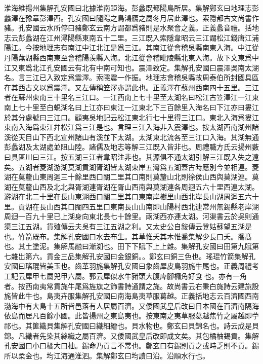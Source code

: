淮海維揚州集解孔安國曰北據淮南距海。彭蠡既都陽鳥所居。集解鄭玄曰地理志彭蠡澤在豫章彭澤西。孔安國曰隨陽之鳥鴻鴈之屬冬月居此澤也。索隱都古文尚書作豬。孔安國云水所停曰豬鄭玄云南方謂都爲豬則是水聚會之義。正義蠡音禮。括地志云彭蠡湖在江州潯陽縣東南五十二里。三江既入索隱韋昭云三江謂松江錢唐江浦陽江。今按地理志有南江中江北江是爲三江。其南江從會稽吳縣南東入海。中江從丹陽蕪湖縣西南東至會稽陽羨縣入海。北江從會稽毗陵縣北東入海。故下文東爲中江又東爲北江孔安國云有北有中南可知也。震澤致定。集解孔安國曰震澤吳南太湖名。言三江已入致定爲震澤。索隱震一作振。地理志會稽吳縣故周泰伯所封國具區在其西古文以爲震澤。又左傳稱笠澤亦謂此也。正義澤在蘇州西南四十五里。三江者在蘇州東南三十里名三江口。一江西南上七十里至太湖名曰松江古笠澤江一江東南上七十里至白蜆湖名曰上江亦曰東江一江東北下三百餘里入海名曰下江亦曰婁江於其分處號曰三江口。顧夷吳地記云松江東北行七十里得三江口。東北入海爲婁江東南入海爲東江幷松江爲三江是也。言理三江入海非入震澤也。按太湖西南湖州諸溪從天目山下西北宣州諸山有溪並下太湖。太湖東北流各至三江口入海。其湖無通彭蠡湖及太湖處並阻山陸。諸儒及地志等解三江既入皆非也。周禮職方氏云揚州藪曰具區川曰三江。按五湖三江者韋昭注非也。其源俱不通太湖引解三江既入失之遠矣。五湖者菱湖游湖莫湖貢湖胥湖皆太湖東岸五灣爲五湖蓋古時應別今並相連。菱湖在莫釐山東周迴三十餘里西口闊二里其口南則莫釐山北則徐侯山西與莫湖連。莫湖在莫釐山西及北北與胥湖連胥湖在胥山西南與莫湖連各周迴五六十里西連太湖。游湖在北二十里在長山東湖西口闊二里其口東南岸樹里山西北岸長山湖周迴五六十里。貢湖在長山西其口闊四五里口東南長山山南即山陽村西北連常州無錫縣老岸湖周迴一百九十里已上湖身向東北長七十餘里。兩湖西亦連太湖。河渠書云於吳則通渠三江五湖。貨殖傳云夫吳有三江五湖之利。又太史公自敍傳云登姑蘇望五湖是也。竹箭既布。集解孔安國曰水去布生。其草惟夭其木惟喬集解少長曰夭。喬髙也。其土塗泥。集解馬融曰漸洳也。田下下賦下上上雜。集解孔安國曰田第九賦第七雜岀第六。貢金三品集解孔安國曰金銀銅。。鄭玄曰銅三色也。瑤琨竹箭集解孔安國曰瑤琨皆美玉也。齒革羽旄集解孔安國曰象齒犀皮鳥羽旄牛尾也。正義周禮考工記云犀甲七屬兕甲六屬。郭云犀似水牛豬頭大腹庳腳橢角好食𣗥也。亦有一角者。按西南夷常貢旄牛尾爲旌旗之飾書詩通謂之旄。故尚書云右秉白旄詩云建旐設旄皆此牛也。島夷卉服集解孔安國曰南海島夷草服葛越。正義括地志云百濟國西南渤海中有大島十五所皆邑落有人居屬百濟。又倭國武皇后改曰日本國在百濟南隔海依島而居凡百餘小國。此皆揚州之東島夷也。按東南之夷草服葛越焦竹之屬越即苧祁也。其篚織貝集解孔安國曰織細繒也。貝水物也。鄭玄曰貝錦名也。詩云成是貝錦。凡織者先染其絲織之屬百濟。又倭國武皇后改即成文矣。其包橘柚錫貢。集解孔安國曰小曰橘大曰柚。錫命乃貢言不常也。鄭玄曰有錫則貢之或時乏則不貢。錫所以柔金也。均江海通淮泗。集解鄭玄曰均讀曰沿。沿順水行也。


